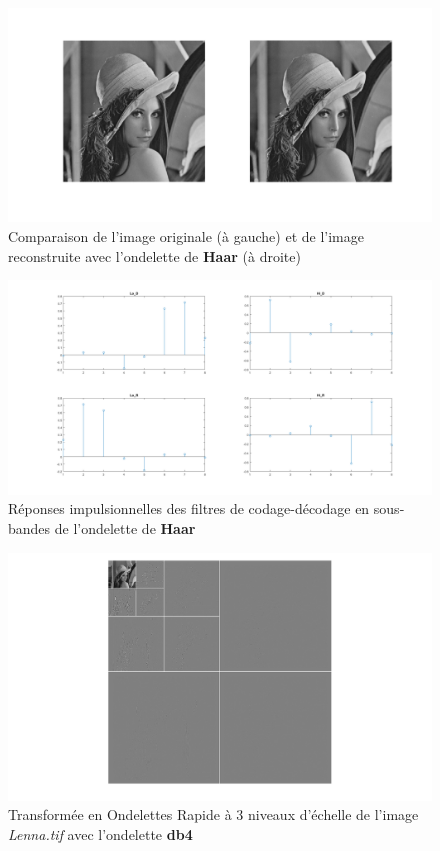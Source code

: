 \documentclass[12pt]{article}
\begin{document}
\begin{figure}[H]
	\centering
	\hspace*{-2.15cm}
	\includegraphics[width = 1.2\textwidth]{images/3-1-reconstruction-db1}	\captionsetup{justification=centering}
	\caption{Comparaison de l'image originale (à gauche) et de l'image reconstruite avec l'ondelette de \textbf{Haar} (à droite)}
	\label{reconstructiondb1}
\end{figure}

\begin{figure}[H]
	\centering
	\centerline{\includegraphics[width = 1.3\textwidth]{images/3-1-reponsesImpulsionnelles-db4}}
	\captionsetup{justification=centering}
	\caption{Réponses impulsionnelles des filtres de codage-décodage en sous-bandes de l'ondelette de \textbf{Haar}}
	\label{impulsedb4}
\end{figure}

\begin{figure}[H]
	\centering
	\centerline{\includegraphics[width = 1.6\textwidth]{images/3-1-db4}}
	\captionsetup{justification=centering}
	\caption{Transformée en Ondelettes Rapide à 3 niveaux d'échelle de l'image \textit{Lenna.tif} avec l'ondelette \textbf{db4}}
	\label{TORdb4}
\end{figure}
\end{document}
